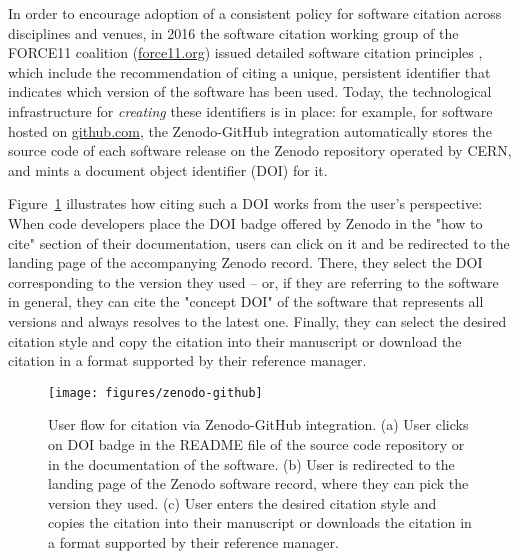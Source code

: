 \documentclass[9pt,review,ASAPversion]{livecoms}
\begin{document}
In order to encourage adoption of a consistent policy for software citation across disciplines and venues, in 2016 the software citation working group of the FORCE11 coalition (\url{force11.org}) issued detailed software citation principles \cite{Smith2016}, which include the recommendation of citing a unique, persistent identifier that indicates which version of the software has been used.
Today, the technological infrastructure for \emph{creating} these identifiers is in place:
for example, for software hosted on \url{github.com}, the Zenodo-GitHub integration \cite{zenodo-github-integration} automatically stores the source code of each software release on the Zenodo repository operated by CERN, and mints a document object identifier (DOI) for it.

Figure~\ref{fig:zenodo-github} illustrates how citing such a DOI works from the user's perspective:
When code developers place the DOI badge offered by Zenodo in the "how to cite" section of their documentation, users can click on it and be redirected to the landing page of the accompanying Zenodo record.
There, they select the DOI corresponding to the version they used -- or, if they are referring to the software in general, they can cite the "concept DOI" of the software that represents all versions and always resolves to the latest one.
Finally, they can select the desired citation style and copy the citation into their manuscript or download the citation in a format supported by their reference manager.

\begin{figure}
    \texttt{[image: figures/zenodo-github]}
    \caption{
        User flow for citation via Zenodo-GitHub integration.
        (a) User clicks on DOI badge in the README file of the source code repository or in the documentation of the software.
        (b) User is redirected to the landing page of the Zenodo software record, where they can pick the version they used.
        (c) User enters the desired citation style and copies the citation \cite{Sun2020c} into their manuscript or downloads the citation in a format supported by their reference manager.
    }
    \label{fig:zenodo-github}
\end{figure}


%  
%  
%  
\end{document}
